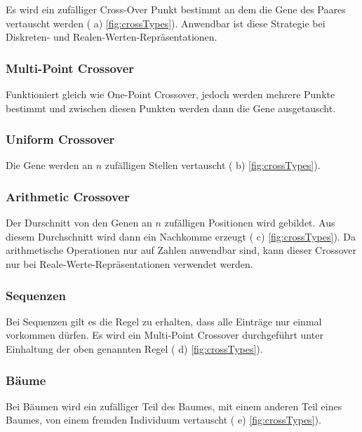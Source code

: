           Es wird ein zufälliger Cross-Over Punkt bestimmt an dem die Gene des Paares vertauscht werden ( a) \vref{fig:crossTypes}).
          Anwendbar ist diese Strategie bei Diskreten- und Realen-Werten-Repräsentationen.

        \subsubsection{Multi-Point Crossover}

          Funktioniert gleich wie One-Point Crossover, jedoch werden mehrere Punkte bestimmt und
          zwischen diesen Punkten werden dann die Gene ausgetauscht.

        \subsubsection{Uniform Crossover}

          Die Gene werden an \(n\) zufälligen Stellen vertauscht ( b) \vref{fig:crossTypes}).

        \subsubsection{Arithmetic Crossover}

          Der Durschnitt von den Genen an \(n\) zufälligen Positionen wird gebildet.
          Aus diesem Durchschnitt wird dann ein Nachkomme erzeugt ( c) \vref{fig:crossTypes}).
          Da arithmetische Operationen nur auf Zahlen anwendbar sind,
          kann dieser Crossover nur bei Reale-Werte-Repräsentationen verwendet werden.

        \subsubsection{Sequenzen}

          Bei Sequenzen gilt es die Regel zu erhalten, dass alle Einträge nur einmal vorkommen dürfen.
          Es wird ein Multi-Point Crossover durchgeführt unter Einhaltung der oben genannten Regel ( d) \vref{fig:crossTypes}).

        \subsubsection{Bäume}

          Bei Bäumen wird ein zufälliger Teil des Baumes, mit einem anderen Teil eines Baumes, von einem fremden Individuum vertauscht ( e) \vref{fig:crossTypes}).

